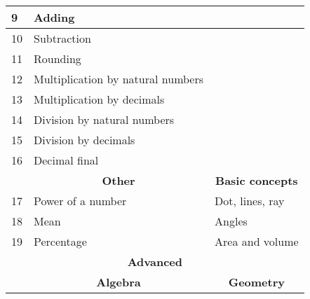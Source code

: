 \documentclass[a4paper]{article}
\begin{document}
\begin{center}
\begin{longtable}{|lll|}
    \multicolumn{1}{|l|}{9}  & \multicolumn{1}{l|}{Adding}                            &                                                       \\ \hline
    \multicolumn{1}{|l|}{10} & \multicolumn{1}{l|}{Subtraction}                       &                                                       \\ \hline
    \multicolumn{1}{|l|}{11} & \multicolumn{1}{l|}{Rounding}                          &                                                       \\ \hline
    \multicolumn{1}{|l|}{12} & \multicolumn{1}{l|}{Multiplication by natural numbers} &                                                       \\ \hline
    \multicolumn{1}{|l|}{13} & \multicolumn{1}{l|}{Multiplication by decimals}        &                                                       \\ \hline
    \multicolumn{1}{|l|}{14} & \multicolumn{1}{l|}{Division by natural numbers}       &                                                       \\ \hline
    \multicolumn{1}{|l|}{15} & \multicolumn{1}{l|}{Division by decimals}              &                                                       \\ \hline
    \multicolumn{1}{|l|}{16} & \multicolumn{1}{l|}{Decimal final}                     &                                                       \\ \hline
    \multicolumn{1}{|l|}{}   & \multicolumn{1}{c|}{\textbf{Other}}                    & \multicolumn{1}{c|}{\textbf{Basic concepts}}          \\ \hline
    \multicolumn{1}{|l|}{17} & \multicolumn{1}{l|}{Power of a number}                 & Dot, lines, ray                                       \\ \hline
    \multicolumn{1}{|l|}{18} & \multicolumn{1}{l|}{Mean}                              & Angles                                                \\ \hline
    \multicolumn{1}{|l|}{19} & \multicolumn{1}{l|}{Percentage}                        & Area and volume                                       \\ \hline
    \multicolumn{3}{|c|}{\textbf{Advanced}}                                                                                                   \\ \hline
    \multicolumn{1}{|l|}{}   & \multicolumn{1}{c|}{\textbf{Algebra}}                  & \multicolumn{1}{c|}{\textbf{Geometry}}                \\ \hline

\end{longtable}
\end{center}
\end{document}
